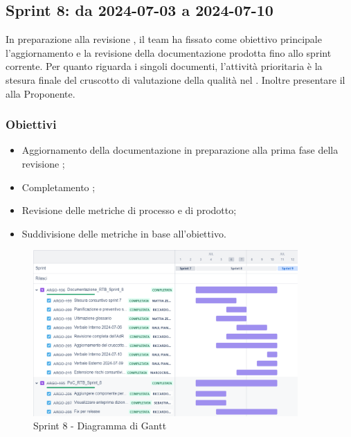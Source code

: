 \subsection{Sprint 8: da 2024-07-03 a 2024-07-10}
\par In preparazione alla revisione , il team ha fissato come obiettivo principale l’aggiornamento e la revisione della documentazione prodotta fino allo sprint corrente. Per quanto riguarda i singoli documenti, l’attività prioritaria è la stesura finale del cruscotto di valutazione della qualità nel \PdQ. Inoltre presentare il  alla Proponente.

\subsubsection{Obiettivi}
\begin{itemize}
  \item Aggiornamento della documentazione in preparazione alla prima fase della revisione ;
  \item Completamento ;
  \item Revisione delle metriche di processo e di prodotto;
  \item Suddivisione delle metriche in base all'obiettivo.
\end{itemize}

\begin{figure}[H]
  \centering
  \includegraphics[width=0.90\textwidth]{assets/Pianificazione/Sprint-8/gantt.png}
  \caption{Sprint 8 - Diagramma di Gantt}\label{fig:sprint-8-gantt}
\end{figure}
